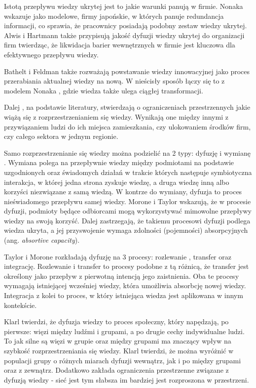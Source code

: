 Istotą przepływu wiedzy ukrytej jest to jakie warunki panują
w firmie. Nonaka \cite{No-98} wskazuje jako modelowe, firmy japońskie, w
których panuje redundancja informacji, co sprawia, że pracownicy
posiadają podobny zestaw wiedzy ukrytej. Alwis i Hartmann \cite{Al-Ha-08}
także przypisują jakość dyfuzji wiedzy ukrytej do organizacji
firm twierdząc, że likwidacja barier wewnętrznych w firmie jest
kluczowa dla efektywnego przepływu wiedzy.

Bathelt i Feldman \cite{Ba-Fe-11} także rozważają powstawanie wiedzy
innowacyjnej jako proces przerabiania aktualnej wiedzy na nową.
W nieścisły sposób łączy się to z modelem Nonaka \cite{No-98}, gdzie
wiedza także ulega ciągłej transformacji. 

Dalej \cite{Ba-Fe-11}, na podstawie literatury, 
stwierdzają o ograniczeniach przestrzennych jakie wiążą się z
rozprzestrzenianiem się wiedzy. Wynikają one między innymi z
przywiązaniem ludzi do ich miejsca zamieszkania, czy ulokowaniem
środków firm, czy całego sektora w jednym regionie.

Samo rozprzestrzenianie się wiedzy można podzielić na 2 typy:
dyfuzję i wymianę \cite{Mo-Ta-09}. Wymiana polega na
przepływnie wiedzy między podmiotami na podstawie uzgodnionych
oraz świadomych działań w trakcie których następuje symbiotyczna
interakcja, w której jedna strona zyskuje wiedzę, a druga
wiedzę inną albo korzyści niezwiązane z samą wiedzą. W kontrze
do wymiany, dyfuzja to proces nieświadomego przepływu samej wiedzy.
Morone i Taylor wskazują, że w procesie dyfuzji, podmioty będące
odbiorcami mogą wykorzystywać mimowolne przepływy wiedzy na
swoją korzyść. Dalej zastrzegają, że takiemu procesowi dyfuzji
podlega wiedza ukryta, a jej przyswojenie wymaga zdolności 
(pojemności) absorpcyjnych (ang. \textit{absortive capacity}).

Taylor i Morone \cite{Mo-Ta-09} rozkładają dyfuzję na 3 procesy:
rozlewanie , transfer oraz integrację. Rozlewanie
i transfer to procesy podobne z tą różnicą, że transfer jest
określony jako przepływ z pierwotną intencją jego zaistnienia.
Oba te procesy wymagają istniejącej wcześniej wiedzy, która
umożliwia absorbcję nowej wiedzy. Integracja z kolei to proces,
w który istniejąca wiedza jest aplikowana w innym kontekście.

Klarl \cite{Kl-14} twierdzi, że dyfuzja wiedzy to proces społeczny,
który napędzają, po pierwsze: więzi między ludźmi i grupami,
a po drugie cechy indywidualne ludzi. To jak silne są więzi
w grupie oraz między grupami ma znaczący wpływ na szybkość
rozprzestrzeniania się wiedzy. Klarl twierdzi, że można
wyróżnić w populacji grupy o różnych miarach dyfuzji wewnątrz,
jak i po między grupami oraz z zewnątrz. Dodatkowo zakłada
ograniczenia przestrzenne związane z dyfuzją wiedzy - sieć
jest tym słabsza im bardziej jest rozproszona w przestrzeni.


